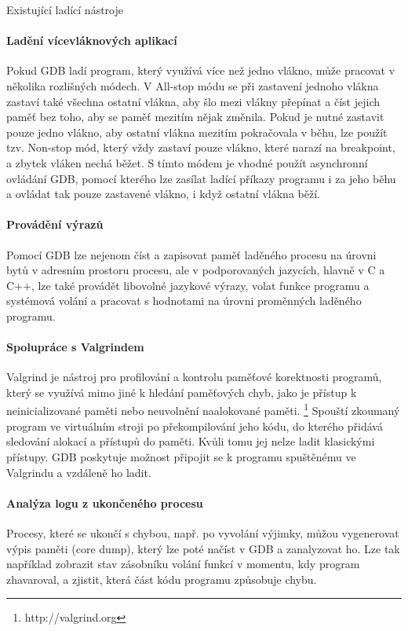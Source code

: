\documentclass[czech,bachelor,male,python,dept460]{diploma}						%
\begin{document}
\begin{section}{Existující ladící nástroje}
		\paragraph*{Ladění vícevláknových aplikací}
			Pokud GDB ladí program, který využívá více než jedno vlákno, může pracovat v několika rozlišných módech\cite{gdb-multithreading}.
			V All-stop módu se při zastavení jednoho vlákna zastaví také všechna ostatní vlákna, aby šlo mezi vlákny přepínat a číst jejich paměť bez toho,
			aby se paměť mezitím nějak změnila. Pokud je nutné zastavit pouze jedno vlákno, aby ostatní vlákna mezitím pokračovala v běhu, lze použít tzv. Non-stop mód,
			který vždy zastaví pouze vlákno, které narazí na breakpoint, a zbytek vláken nechá běžet. S tímto módem je vhodné použít asynchronní ovládání GDB,
			pomocí kterého lze zasílat ladící příkazy programu i za jeho běhu a ovládat tak pouze zastavené vlákno, i když ostatní vlákna běží.
		\paragraph*{Provádění výrazů}
			Pomocí GDB lze nejenom číst a zapisovat paměť laděného procesu na úrovni bytů v adresním prostoru procesu, ale v podporovaných jazycích, hlavně
			v C a C++, lze také provádět libovolné jazykové výrazy, volat funkce programu a systémová volání a pracovat s hodnotami na úrovni proměnných
			laděného programu.
		\paragraph*{Spolupráce s Valgrindem}
			Valgrind je nástroj pro profilování a kontrolu paměťové korektnosti programů, který se využívá mimo jiné k hledání paměťových chyb, jako je přístup k
			neinicializované paměti nebo neuvolnění naalokované paměti. \footnote{http://valgrind.org}
			Spouští zkoumaný program ve virtuálním stroji po překompilování jeho kódu, do kterého přidává sledování alokací a přístupů do paměti.
			Kvůli tomu jej nelze ladit klasickými přístupy. GDB poskytuje možnost připojit se k programu spuštěnému ve Valgrindu a vzdáleně ho ladit.
		\paragraph*{Analýza logu z ukončeného procesu}
			Procesy, které se ukončí s chybou, např. po vyvolání výjimky, můžou vygenerovat výpis paměti (core dump), který lze poté načíst v GDB a zanalyzovat ho.
			Lze tak například zobrazit stav zásobníku volání funkcí v momentu, kdy program zhavaroval, a zjistit, která část kódu programu způsobuje chybu.

\end{section}
\end{document}
